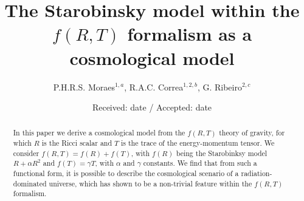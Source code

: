%



\title{The Starobinsky model within the $f(R,T)$ formalism as a cosmological model}
\author{P.H.R.S. Moraes$^{1,a}$, R.A.C. Correa$^{1,2,b}$, G. Ribeiro$^{2,c}$}
\date{Received: date / Accepted: date}
\maketitle

\begin{abstract}
In this paper we derive a cosmological model from the $f(R,T)$ theory of
gravity, for which $R$ is the Ricci scalar and $T$ is the trace of the
energy-momentum tensor. We consider $f(R,T)=f(R)+f(T)$, with $f(R)$ being
the Starobinksy model $R+\alpha R^{2}$ and $f(T)=\gamma T$, with $\alpha$
and $\gamma$ constants. We find that from such a functional form, it is
possible to describe the cosmological scenario of a radiation-dominated
universe, which has shown to be a non-trivial feature within the $f(R,T)$ formalism. 

\ 

\end{abstract}






